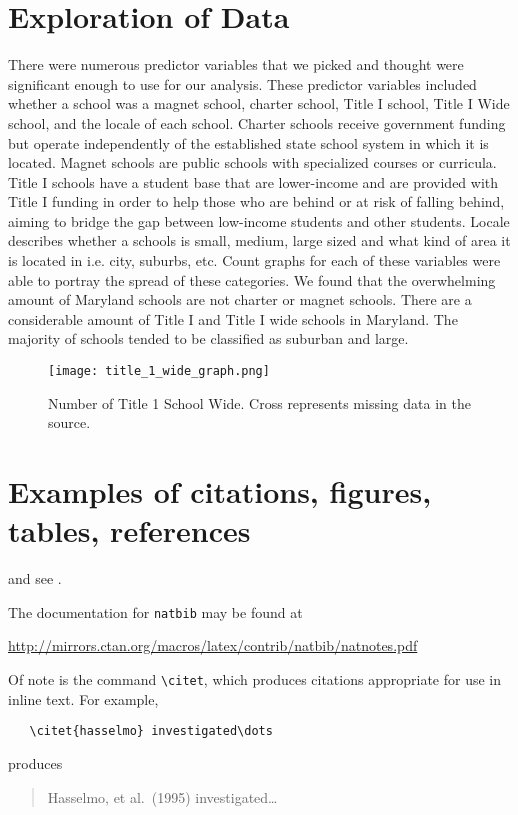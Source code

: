 \documentclass[12pt]{article}
\begin{document}
\section{Exploration of Data}
There were numerous predictor variables that we picked and thought were significant 
enough to use for our analysis. These predictor variables included whether a 
school was a magnet school, charter school, Title I school, Title I Wide school, 
and the locale of each school. Charter schools receive government funding but 
operate independently of the established state school system in which it is located. 
Magnet schools are public schools with specialized courses or curricula. Title I
schools have a student base that are lower-income and are provided with Title I 
funding in order to help those who are behind or at risk of falling behind, aiming 
to bridge the gap between low-income students and other students. Locale describes 
whether a schools is small, medium, large sized and what kind of area it is located 
in i.e. city, suburbs, etc. Count graphs for each of these variables were able to 
portray the spread of these categories. We found that the overwhelming amount of 
Maryland schools are not charter or magnet schools. There are a considerable amount 
of Title I and Title I wide schools in Maryland. The majority of schools tended to 
be classified as suburban and large.

\begin{figure}[!htb]
  \centering
  \texttt{[image: title\_1\_wide\_graph.png]}
  \caption{Number of Title 1 School Wide. Cross represents missing data in the source.}
  \label{fig:title_1_wide}
\end{figure}

\section{Examples of citations, figures, tables, references}
\label{sec:others}
\lipsum[8] \cite{kour2014real,kour2014fast} and see \cite{hadash2018estimate}.

The documentation for \verb+natbib+ may be found at
\begin{center}
  \url{http://mirrors.ctan.org/macros/latex/contrib/natbib/natnotes.pdf}
\end{center}
Of note is the command \verb+\citet+, which produces citations
appropriate for use in inline text.  For example,
\begin{verbatim}
   \citet{hasselmo} investigated\dots
\end{verbatim}
produces
\begin{quote}
  Hasselmo, et al.\ (1995) investigated\dots
\end{quote}
\end{document}
